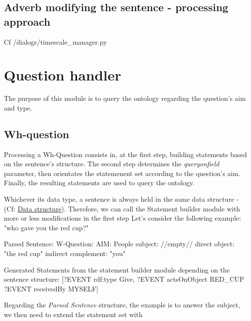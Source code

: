 \documentclass[twoside,a4paper,10pt]{report}
\newcommand{\dokutitleleveltwo}[1]{\chapter{#1}}
\newcommand{\dokutitleleveltree}[1]{\section{#1}}
\newcommand{\dokuitalic}[1]{\textsl{#1}}
\begin{document}
\dokutitleleveltree{Adverb modifying the sentence - processing approach}
\label{c09cf52af4b6af491e8452be15d2b9d4}%

\small
\begin{verbatimtab}
  Cf /dialogs/timescale_manager.py
  
\end{verbatimtab}
\normalsize

\dokutitleleveltwo{Question handler}
\label{a4cdd8fe503540d93470f621230c7afc}%

The purpose of this module is to query the ontology regarding the question's aim and type.


\dokutitleleveltree{Wh-question}
\label{9d6af810a2fa23183549f6d43eac05eb}%

Processing a Wh-Question consists in, at the first step, building statements based on the sentence's structure. 
The second step determines the \dokuitalic{query{\textunderscore}on{\textunderscore}field} parameter, then orientates the statemenent set according to the question's aim. 
Finally, the resulting statements are used to query the ontology.

Whichever its data type, a sentence is always held in the same data structure - (Cf: \hyperref[c8f6850ec2ec3fb32f203c1f4e3c2fd2]{Data structure}).
Therefore, we can call the Statement builder module with more or less modifications in the first step
Let's consider the following example: "who gave you the red cup?"


\small
\begin{verbatimtab}
 
   Parsed Sentence:
     W-Question:
     AIM: People
     subject: 			  //empty//
     direct object:  	   "the red cup"
     indirect complement:  "you"
   
   Generated Statements from the statement builder module depending on the sentence structure:
     [?EVENT rdf:type Give, 
      ?EVENT actsOnObject RED_CUP
      ?EVENT receivedBy MYSELF]
     
\end{verbatimtab}
\normalsize
Regarding the \dokuitalic{Parsed Sentence} structure, the example is to answer the subject, we then need to extend the statement set with


\small
\begin{verbatimtab}
\end{verbatimtab}
\normalsize
\end{document}
